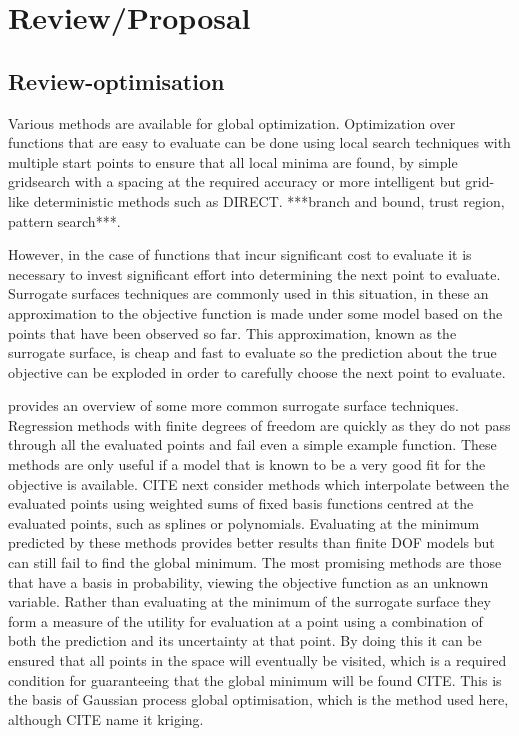 \documentclass[a4paper, 10 pt, conference]{ieeeconf}  %
\begin{document}
\section{Review/Proposal}
\doublespacing
\subsection{Review-optimisation}
Various methods are available for global optimization. Optimization over functions that are easy to evaluate can be done using local search techniques with multiple start points to ensure that all local minima are found, by simple gridsearch with a spacing at the required accuracy or more intelligent but grid-like deterministic methods such as DIRECT. ***branch and bound, trust region, pattern search***.

However, in the case of functions that incur significant cost to evaluate it is necessary to invest significant effort into determining the next point to evaluate. Surrogate surfaces techniques are commonly used in this situation, in these an approximation to the objective function is made under some model based on the points that have been observed so far. This approximation, known as the surrogate surface, is cheap and fast to evaluate so the prediction about the true objective can be exploded in order to carefully choose the next point to evaluate.

\cite{jones2001taxonomy} provides an overview of some more common surrogate surface techniques. Regression methods with finite degrees of freedom are quickly as they do not pass through all the evaluated points and fail even a simple example function. These methods are only useful if a model that is known to be a very good fit for the objective is available. CITE next consider methods which interpolate between the evaluated points using weighted sums of fixed basis functions centred at the evaluated points, such as splines or polynomials. Evaluating at the minimum predicted by these methods provides better results than finite DOF models but can still fail to find the global minimum. The most promising methods are those that have a basis in probability, viewing the objective function as an unknown variable. Rather than evaluating at the minimum of the surrogate surface they form a measure of the utility for evaluation at a point using a combination of both the prediction and its uncertainty at that point. By doing this it can be ensured that all points in the space will eventually be visited, which is a required condition for guaranteeing that the global minimum will be found CITE. This is the basis of Gaussian process global optimisation, which is the method used here, although CITE name it kriging.
\end{document}
